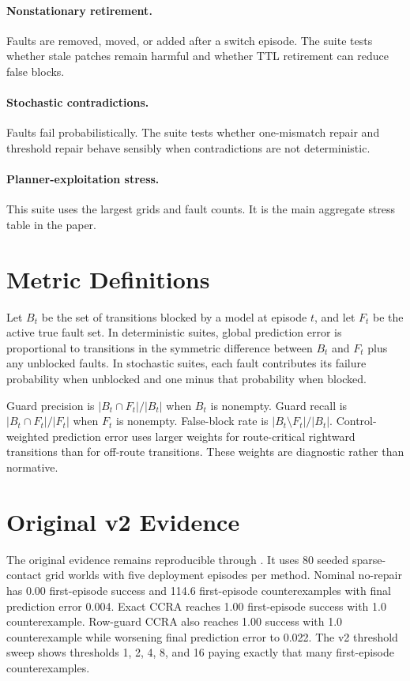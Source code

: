 \documentclass{article}
\begin{document}
\paragraph{Nonstationary retirement.}
Faults are removed, moved, or added after a switch episode. The suite tests whether stale patches remain harmful and whether TTL retirement can reduce false blocks.

\paragraph{Stochastic contradictions.}
Faults fail probabilistically. The suite tests whether one-mismatch repair and threshold repair behave sensibly when contradictions are not deterministic.

\paragraph{Planner-exploitation stress.}
This suite uses the largest grids and fault counts. It is the main aggregate stress table in the paper.

\section{Metric Definitions}

Let $B_t$ be the set of transitions blocked by a model at episode $t$, and let $F_t$ be the active true fault set. In deterministic suites, global prediction error is proportional to transitions in the symmetric difference between $B_t$ and $F_t$ plus any unblocked faults. In stochastic suites, each fault contributes its failure probability when unblocked and one minus that probability when blocked.

Guard precision is $|B_t\cap F_t|/|B_t|$ when $B_t$ is nonempty. Guard recall is $|B_t\cap F_t|/|F_t|$ when $F_t$ is nonempty. False-block rate is $|B_t\setminus F_t|/|B_t|$. Control-weighted prediction error uses larger weights for route-critical rightward transitions than for off-route transitions. These weights are diagnostic rather than normative.

\section{Original v2 Evidence}

The original evidence remains reproducible through . It uses 80 seeded sparse-contact grid worlds with five deployment episodes per method. Nominal no-repair has 0.00 first-episode success and 114.6 first-episode counterexamples with final prediction error 0.004. Exact CCRA reaches 1.00 first-episode success with 1.0 counterexample. Row-guard CCRA also reaches 1.00 success with 1.0 counterexample while worsening final prediction error to 0.022. The v2 threshold sweep shows thresholds 1, 2, 4, 8, and 16 paying exactly that many first-episode counterexamples.
\end{document}
